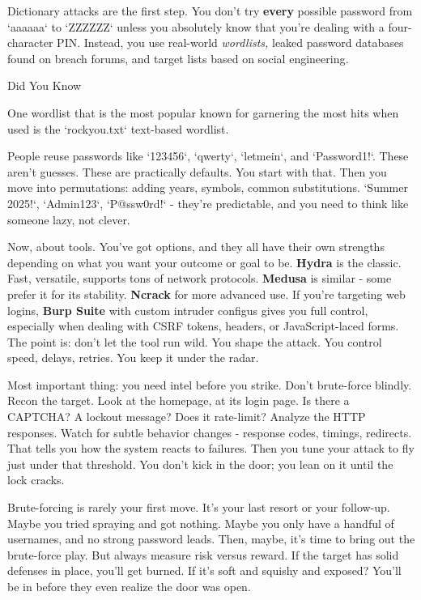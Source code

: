 Dictionary attacks are the first step. You don’t try \textbf{every} possible password from `aaaaaa` to `ZZZZZZ` unless you absolutely know that you’re dealing with a four-character PIN. Instead, you use real-world \textit{wordlists, }leaked password databases found on breach forums, and target lists based on social engineering\textit{.}

Did You Know

One wordlist that is the most popular known for garnering the most hits when used is the `rockyou.txt` text-based wordlist. 

People reuse passwords like `123456`, `qwerty`, `letmein`, and `Password1!`. These aren’t guesses. These are practically defaults. You start with that. Then you move into permutations: adding years, symbols, common substitutions. `Summer 2025!`, `Admin123`, `P@ssw0rd!` - they’re predictable, and you need to think like someone lazy, not clever.

Now, about tools. You’ve got options, and they all have their own strengths depending on what you want your outcome or goal to be. \textbf{Hydra} is the classic. Fast, versatile, supports tons of network protocols. \textbf{Medusa} is similar - some prefer it for its stability. \textbf{Ncrack} for more advanced use. If you’re targeting web logins, \textbf{Burp Suite} with custom intruder configus gives you full control, especially when dealing with CSRF tokens, headers, or JavaScript-laced forms. The point is: don’t let the tool run wild. You shape the attack. You control speed, delays, retries. You keep it under the radar.

Most important thing: you need intel before you strike. Don’t brute-force blindly. Recon the target. Look at the homepage, at its login page. Is there a CAPTCHA? A lockout message? Does it rate-limit? Analyze the HTTP responses. Watch for subtle behavior changes - response codes, timings, redirects. That tells you how the system reacts to failures. Then you tune your attack to fly just under that threshold. You don’t kick in the door; you lean on it until the lock cracks.

Brute-forcing is rarely your first move. It’s your last resort or your follow-up. Maybe you tried spraying and got nothing. Maybe you only have a handful of usernames, and no strong password leads. Then, maybe, it’s time to bring out the brute-force play. But always measure risk versus reward. If the target has solid defenses in place, you’ll get burned. If it’s soft and squishy and exposed? You’ll be in before they even realize the door was open.

